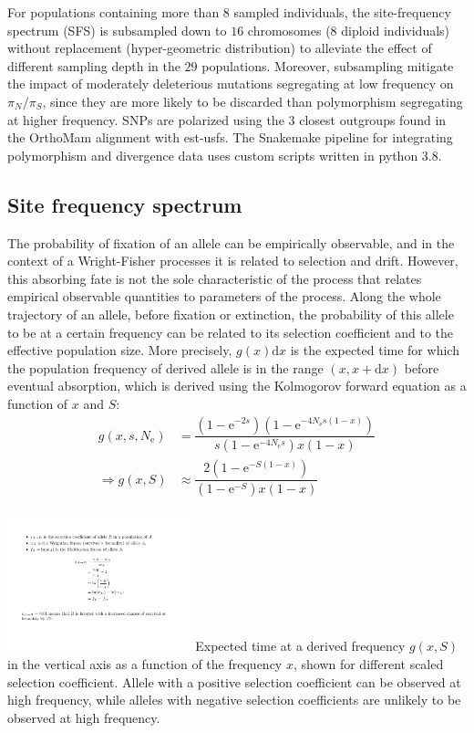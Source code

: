 \documentclass{article}
\newcommand{\der}{\mathrm{d}}
\newcommand{\e}{\mathrm{e}}
\newcommand{\Ne}{N_{\mathrm{e}}}
\newcommand{\pn}{\pi_N}
\newcommand{\ps}{\pi_S}
\newcommand{\pnps}{\pn / \ps}
\begin{document}
    For populations containing more than $8$ sampled individuals, the site-frequency spectrum (SFS) is subsampled down to $16$ chromosomes ($8$ diploid individuals) without replacement (hyper-geometric distribution) to alleviate the effect of different sampling depth in the $29$ populations.
    Moreover, subsampling mitigate the impact of moderately deleterious mutations segregating at low frequency on $\pnps$, since they are more likely to be discarded than polymorphism segregating at higher frequency.
    SNPs are polarized using the $3$ closest outgroups found in the OrthoMam alignment with est-usfs\cite{keightley_inferring_2018}.
    The Snakemake pipeline for integrating polymorphism and divergence data uses custom scripts written in python 3.8.

    \subsection{Site frequency spectrum}
    The probability of fixation of an allele can be empirically observable, and in the context of a Wright-Fisher processes it is related to selection and drift.
    However, this absorbing fate is not the sole characteristic of the process that relates empirical observable quantities to parameters of the process.
    Along the whole trajectory of an allele, before fixation or extinction, the probability of this allele to be at a certain frequency can be related to its selection coefficient and to the effective population size.
    More precisely, $g(x) \der x $ is the expected time for which the population frequency of derived allele is in the range $(x, x+\der x)$ before eventual absorption, which is derived using the Kolmogorov forward equation as a function of $x$ and $S$:
    \begin{align}
        g(x, s, \Ne) & = \dfrac{\left( 1 - \e^{- 2 s }\right) \left( 1 - \e^{-4 \Ne s(1-x)}\right)}{ s (1 - \e^{-4 \Ne s})x(1-x)} \\
        \Rightarrow g(x, S) & \approx \dfrac{2 \left( 1 - \e^{-S(1-x)}\right)}{(1 - \e^{-S})x(1-x)} \label{eq:expected_time}
    \end{align}

    \begin{center}
        \includegraphics[width=0.4\textwidth, page=4] {artworks/figures.pdf}
        \flushleft
        Expected time at a derived frequency $g(x, S)$ in the vertical axis as a function of the frequency $x$, shown for different scaled selection coefficient.
        Allele with a positive selection coefficient can be observed at high frequency, while alleles with negative selection coefficients are unlikely to be observed at high frequency.
    \end{center}
\end{document}

